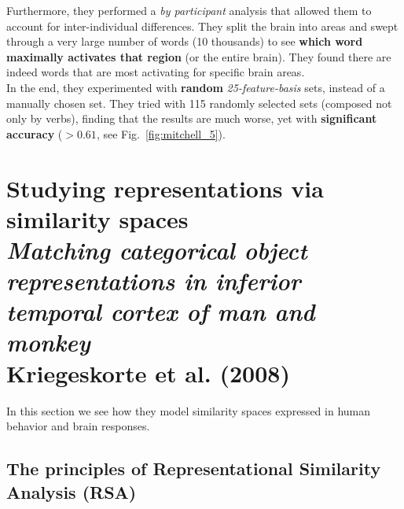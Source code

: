Furthermore, they performed a \textit{by participant} analysis that allowed them to account for inter-individual differences. They split the brain into areas and swept through a very large number of words (10 thousands) to see \textbf{which word maximally activates that region} (or the entire brain).
They found there are indeed words that are most activating for specific brain areas.\\

In the end, they experimented with \textbf{random} \textit{25-feature-basis} sets, instead of a manually chosen set. They tried with 115 randomly selected sets (composed not only by verbs), finding that the results are much worse, yet with \textbf{significant accuracy} ($>0.61$, see Fig.~\ref{fig:mitchell_5}).




\section[Studying representations via similarity spaces]{Studying representations via similarity spaces\\ \large{\textit{Matching categorical object representations in inferior temporal cortex of man and monkey}\\ Kriegeskorte et al. (2008)}}
\label{sec:kriegeskorte}
In this section we see how they model similarity spaces expressed in human behavior and brain responses.

\subsection{The principles of Representational Similarity Analysis (RSA)}

